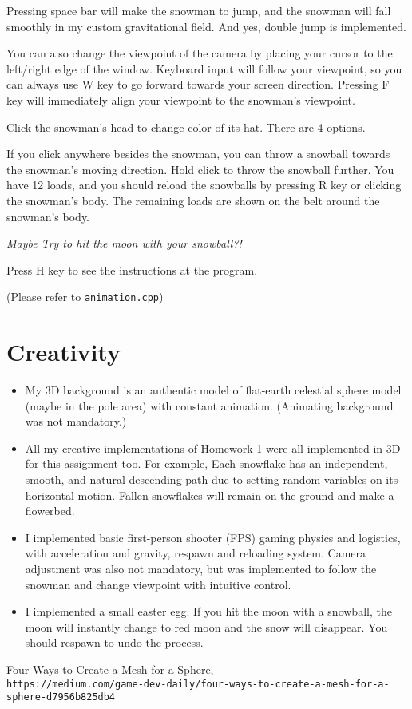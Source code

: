 \documentclass[10pt,a4paper]{article}
\begin{document}
	Pressing space bar will make the snowman to jump, and the snowman will fall smoothly in my custom gravitational field. And yes, double jump is implemented. 
	
	You can also change the viewpoint of the camera by placing your cursor to the left/right edge of the window. Keyboard input will follow your viewpoint, so you can always use W key to go forward towards your screen direction. Pressing F key will immediately align your viewpoint to the snowman's viewpoint. 
	
	Click the snowman's head to change color of its hat. There are 4 options.
	
	If you click anywhere besides the snowman, you can throw a snowball towards the snowman's moving direction. Hold click to throw the snowball further. You have 12 loads, and you should reload the snowballs by pressing R key or clicking the snowman's body. The remaining loads are shown on the belt around the snowman's body.
	
	\emph{Maybe Try to hit the moon with your snowball?!}
	
	Press H key to see the instructions at the program.
	
	\begin{flushright}
		(Please refer to \texttt{animation.cpp})
	\end{flushright}
	
	
	\section{Creativity}	
	\begin{itemize}
		\item My 3D background is an authentic model of flat-earth celestial sphere model (maybe in the pole area) with constant animation. (Animating background was not mandatory.)
		
		\item All my creative implementations of Homework 1 were all implemented in 3D for this assignment too. For example, Each snowflake has an independent, smooth, and natural descending path due to setting random variables on its horizontal motion. Fallen snowflakes will remain on the ground and make a flowerbed. 
		
		\item I implemented basic first-person shooter (FPS) gaming physics and logistics, with acceleration and gravity, respawn and reloading system. Camera adjustment was also not mandatory, but was implemented to follow the snowman and change viewpoint with intuitive control.
		
		\item I implemented a small easter egg. If you hit the moon with a snowball, the moon will instantly change to red moon and the snow will disappear. You should respawn to undo the process.		
	\end{itemize} 
		
	\begin{thebibliography}{9}
		Four Ways to Create a Mesh for a Sphere,
		\\\texttt{https://medium.com/game-dev-daily/four-ways-to-create-a-mesh-for-a-sphere-d7956b825db4}
	\end{thebibliography}
\end{document}
